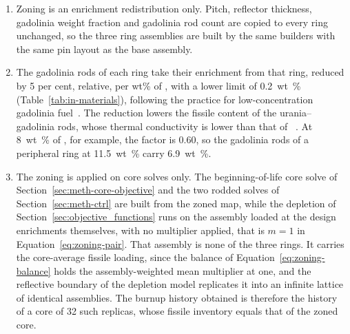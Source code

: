 \begin{enumerate}
  \item Zoning is an enrichment redistribution only. Pitch, reflector
        thickness, gadolinia weight fraction and gadolinia rod count
        are copied to every ring unchanged, so the three ring
        assemblies are built by the same builders with the same pin
        layout as the base assembly.

  \item The gadolinia rods of each ring take their 
        enrichment from that ring, reduced by 5 per cent, relative, per
        wt\% of , with a lower limit of \SI{0.2}{wt\%}
        (Table~\ref{tab:in-materials}), following the practice for
        low-concentration gadolinia fuel~\cite{mildrum_segovia_2001}.
        The reduction lowers the fissile
        content of the urania--gadolinia rods, whose thermal conductivity
        is lower than that of ~\cite{mildrum_segovia_2001}. At
        \SI{8}{wt\%} of , for example, the factor is 0.60, so
        the gadolinia rods of a peripheral ring at \SI{11.5}{wt\%} carry
        \SI{6.9}{wt\%}.

  \item The zoning is applied on core solves only. The beginning-of-life
        core solve of Section~\ref{sec:meth-core-objective} and the two
        rodded solves of Section~\ref{sec:meth-ctrl} are built from the
        zoned map, while the depletion of
        Section~\ref{sec:objective_functions} runs on the assembly
        loaded at the design enrichments themselves, with no multiplier
        applied, that is $m = 1$ in
        Equation~\eqref{eq:zoning-pair}. That assembly is none of the
        three rings. It carries the core-average fissile loading, since
        the balance of Equation~\eqref{eq:zoning-balance} holds the
        assembly-weighted mean multiplier at one, and the reflective
        boundary of the depletion model replicates it into an infinite
        lattice of identical assemblies. The burnup history obtained is
        therefore the history of a core of 32 such replicas, whose
        fissile inventory equals that of the zoned core.
\end{enumerate}

\label{sec:meth-zoning-balance}

\label{sec:meth-zoning-study}\label{tab:zoning-transfer}\label{tab:zoning-grid}

